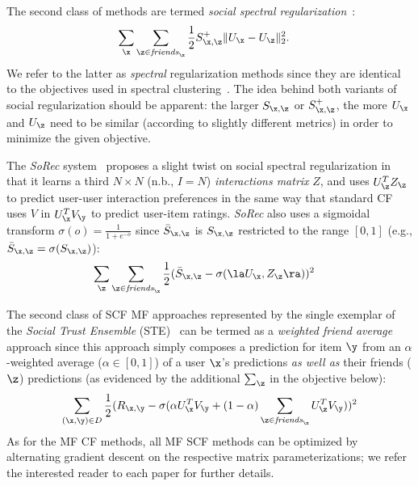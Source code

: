 The second class of methods are termed 
\emph{social spectral regularization}~\cite{sr,rrmf}:
\begin{align}
\sum_{\x} & \sum_{\z \in \mathit{friends}_\x} \frac{1}{2} S^+_{\x,\z} \| U_\x - U_\z \|_2^2 \label{eq:simple_spectral_sr}
\text{.}
\end{align}
We refer to the latter as \emph{spectral} regularization methods since they are
identical to the objectives used in spectral clustering~\cite{spectral}.
The idea behind both variants of social regularization should be apparent:
the larger $S_{\x,\z}$ or $S^+_{\x,\z}$, the more $U_\x$ and $U_\z$ need to
be similar (according to slightly different metrics) 
in order to minimize the given objective.

The {\it SoRec} system~\cite{sorec} proposes a slight twist on social
spectral regularization in that it learns a third $N \times N$ (n.b., $I = N$)
\emph{interactions matrix} $Z$, and uses $U_\z^T Z_\z$ to predict user-user
interaction preferences in the same way that standard CF uses $V$ in
$U_\x^T V_\y$ to predict user-item ratings.  {\it SoRec} also uses a
sigmoidal transform $\sigma(o) = \frac{1}{1 + e^{-o}}$ since $\bar{S}_{\x,\z}$
is $S_{\x,\z}$ restricted to the range $[0,1]$ 
(e.g., $\bar{S}_{\x,\z} = \sigma(S_{\x,\z})$):
%
%
\begin{align}
\sum_{\z} & \sum_{\z \in \mathit{friends}_\x} \frac{1}{2} (\bar{S}_{\x,\z} - \sigma(\la U_\x, Z_\z \ra))^2 
\end{align}

The second class of SCF MF approaches represented by the single
exemplar of the {\it Social Trust Ensemble} (STE)~\cite{ste} can be termed as a
\emph{weighted friend average} approach since this approach simply composes a
prediction for item $\y$ from an $\alpha$-weighted average ($\alpha
\in [0,1]$) of a user $\x$'s predictions \emph{as well as} their friends
($\z$) predictions (as evidenced by the additional $\sum_\z$ in the
objective below):
\begin{align}
\sum_{(\x,\y) \in D} \frac{1}{2} (R_{\x,\y} - \sigma (\alpha U_\x^T V_\y + (1 - \alpha) \sum_{\z \in \mathit{friends}_\x} U_\z^T V_\y))^2 
\end{align}
As for the MF CF methods, all MF SCF methods can be optimized by alternating
gradient descent on the respective matrix parameterizations; we refer
the interested reader to each paper for further details.


